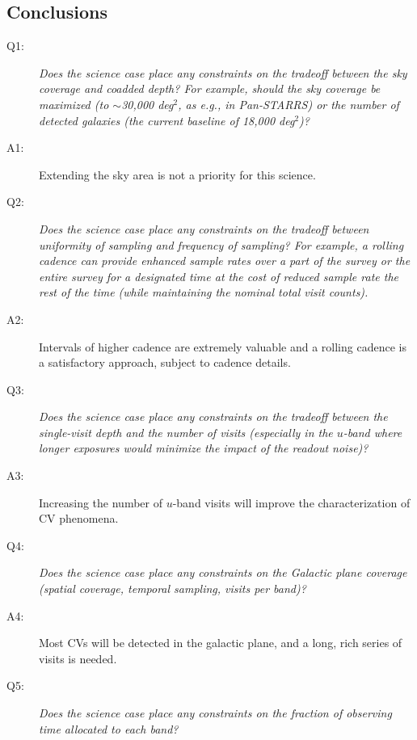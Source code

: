 \subsection{Conclusions}
%
%
 \begin{description}

 \item[Q1:] {\it Does the science case place any constraints on the
 tradeoff between the sky coverage and coadded depth? For example, should
 the sky coverage be maximized (to $\sim$30,000 deg$^2$, as e.g., in
 Pan-STARRS) or the number of detected galaxies (the current baseline 
 of 18,000 deg$^2$)?}

 \item[A1:] Extending the sky area is not a priority for this science.

 \item[Q2:] {\it Does the science case place any constraints on the
 tradeoff between uniformity of sampling and frequency of  sampling? For
 example, a rolling cadence can provide enhanced sample rates over a part
 of the survey or the entire survey for a designated time at the cost of
 reduced sample rate the rest of the time (while maintaining the nominal
 total visit counts).}

 \item[A2:] Intervals of higher cadence are extremely valuable and a rolling cadence is a
satisfactory approach, subject to cadence details.

 \item[Q3:] {\it Does the science case place any constraints on the
 tradeoff between the single-visit depth and the number of visits
 (especially in the $u$-band where longer exposures would minimize the
 impact of the readout noise)?}

 \item[A3:] Increasing the number of $u$-band visits will improve the characterization of CV phenomena.

 \item[Q4:] {\it Does the science case place any constraints on the
 Galactic plane coverage (spatial coverage, temporal sampling, visits per
 band)?}

 \item[A4:] Most CVs will be detected in the galactic plane, and a long, rich series of visits is needed.

 \item[Q5:] {\it Does the science case place any constraints on the
 fraction of observing time allocated to each band?}


\end{description}
